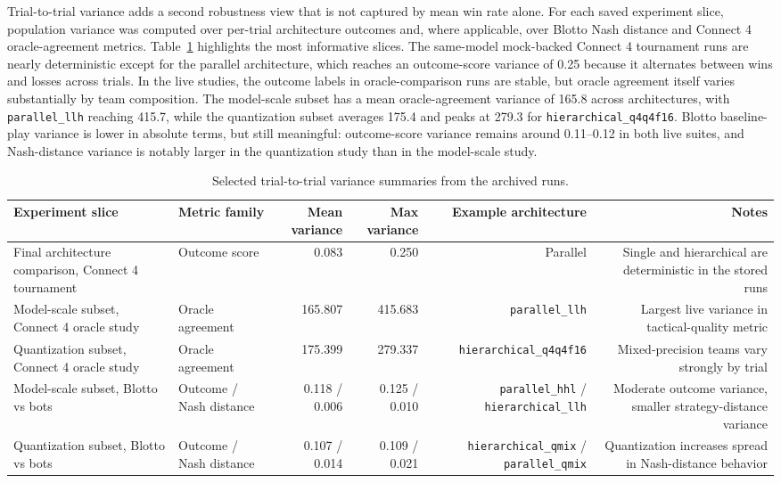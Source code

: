 \documentclass[11pt]{article}
\begin{document}
Trial-to-trial variance adds a second robustness view that is not captured by mean win rate alone. For each saved experiment slice, population variance was computed over per-trial architecture outcomes and, where applicable, over Blotto Nash distance and Connect 4 oracle-agreement metrics. Table~\ref{tab:variance-overview} highlights the most informative slices. The same-model mock-backed Connect 4 tournament runs are nearly deterministic except for the parallel architecture, which reaches an outcome-score variance of 0.25 because it alternates between wins and losses across trials. In the live studies, the outcome labels in oracle-comparison runs are stable, but oracle agreement itself varies substantially by team composition. The model-scale subset has a mean oracle-agreement variance of 165.8 across architectures, with \texttt{parallel\_llh} reaching 415.7, while the quantization subset averages 175.4 and peaks at 279.3 for \texttt{hierarchical\_q4q4f16}. Blotto baseline-play variance is lower in absolute terms, but still meaningful: outcome-score variance remains around 0.11--0.12 in both live suites, and Nash-distance variance is notably larger in the quantization study than in the model-scale study.

\begin{table}[H]
\centering
\caption{Selected trial-to-trial variance summaries from the archived runs.}
\label{tab:variance-overview}
\footnotesize
\begin{adjustbox}{width=0.98\textwidth}
\begin{tabular}{@{}llrrrr@{}}
\toprule
Experiment slice & Metric family & Mean variance & Max variance & Example architecture & Notes \\
\midrule
Final architecture comparison, Connect 4 tournament & Outcome score & 0.083 & 0.250 & Parallel & Single and hierarchical are deterministic in the stored runs \\
Model-scale subset, Connect 4 oracle study & Oracle agreement & 165.807 & 415.683 & \texttt{parallel\_llh} & Largest live variance in tactical-quality metric \\
Quantization subset, Connect 4 oracle study & Oracle agreement & 175.399 & 279.337 & \texttt{hierarchical\_q4q4f16} & Mixed-precision teams vary strongly by trial \\
Model-scale subset, Blotto vs bots & Outcome / Nash distance & 0.118 / 0.006 & 0.125 / 0.010 & \texttt{parallel\_hhl} / \texttt{hierarchical\_llh} & Moderate outcome variance, smaller strategy-distance variance \\
Quantization subset, Blotto vs bots & Outcome / Nash distance & 0.107 / 0.014 & 0.109 / 0.021 & \texttt{hierarchical\_qmix} / \texttt{parallel\_qmix} & Quantization increases spread in Nash-distance behavior \\
\bottomrule
\end{tabular}
\end{adjustbox}
\normalsize
\end{table}
\end{document}
